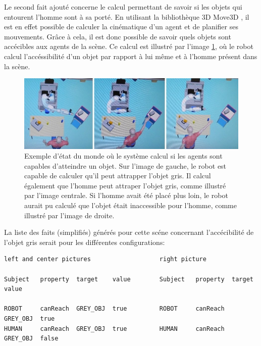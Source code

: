 \documentclass[a4paper,11pt,twoside]{StyleThese}
\begin{document}
Le second fait ajouté concerne le calcul permettant de savoir si les objets qui entourent l'homme sont à sa porté. En utilisant la bibliothèque 3D Move3D  \cite{Simeon2001}, il est en effet possible de calculer la cinématique d'un agent et de planifier ses mouvements. Grâce à cela, il est donc possible de savoir quels objets sont accécibles aux agents de la scène. Ce calcul est illustré par l'image \ref{fig:reach}, où le robot calcul l'accéssibilité d'un objet par rapport à lui même et à l'homme présent dans la scène.



\begin{figure}[ht!]
 \centering
  \includegraphics[width=0.99\linewidth]{./img/reach.jpg} 
  \caption {Exemple d'état du monde où le système calcul si les agents sont capables d'atteindre un objet. Sur l'image de gauche, le robot est capable de calculer qu'il peut attrapper l'objet gris. Il calcul également que l'homme peut attraper l'objet gris, comme illustré par l'image centrale. Si l'homme avait été placé plus loin, le robot aurait pu calculé que l'objet était inaccessible pour l'homme, comme illustré par l'image de droite.}
  \label{fig:reach}
\end{figure}


La liste des faits (simplifiés) générés pour cette scéne concernant l'accécibilité de l'objet gris serait pour les différentes configurations:

\begin{scriptsize}
\begin{verbatim}
left and center pictures                   right picture

Subject   property  target    value        Subject   property  target    value

ROBOT     canReach  GREY_OBJ  true         ROBOT     canReach  GREY_OBJ  true
HUMAN     canReach  GREY_OBJ  true         HUMAN     canReach  GREY_OBJ  false
\end{verbatim}
\end{scriptsize}
\end{document}
